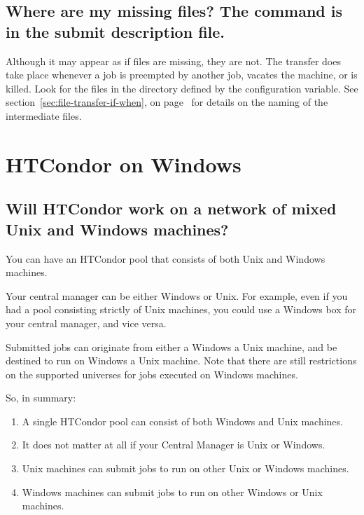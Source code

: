 \subsection*{Where are my missing files?  The command  is in the submit description file.}
Although it may appear as if files are missing,
they are not.
The transfer does take place whenever a job is 
preempted by another job, vacates the machine, or is killed.
Look for the files in the directory defined by
the  configuration variable.
See
section~\ref{sec:file-transfer-if-when}, on
page~\pageref{sec:file-transfer-if-when} for details on the naming
of the intermediate files.

\section{HTCondor on Windows}

\subsection*{Will HTCondor work on a network of mixed Unix and Windows machines?}

You can have an HTCondor pool that consists of both Unix and Windows machines.

Your central manager can be either Windows or Unix.  For example,
even if you had a pool consisting strictly of Unix machines, you could
use a Windows box for your central manager, and vice versa.

Submitted jobs can originate from either a 
Windows  a Unix machine,
and be destined to run on Windows
 a Unix machine.
Note that there are still restrictions on the supported universes
for jobs executed on Windows machines.

So, in summary:

\begin{enumerate}

\item{A single HTCondor pool can consist of both Windows and Unix
machines.}

\item{It does not matter at all if your Central Manager is Unix or Windows.}

\item{Unix machines can submit jobs to run on other Unix or Windows
machines.}

\item{Windows machines can submit jobs to run on other Windows
or Unix machines.}

\end{enumerate}


